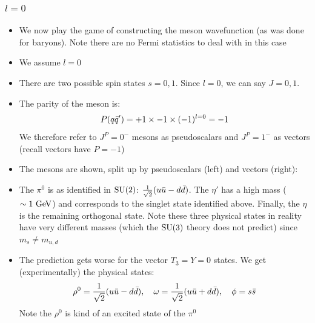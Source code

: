 \subsubsection{$l=0$}
\begin{itemize}
  \item We now play the game of constructing the meson wavefunction (as was done for baryons). Note there are no Fermi statistics to deal with in this case
  \item We assume $l=0$
  \item There are two possible spin states $s=0,1$. Since $l=0$, we can say $J=0,1$.
  \item The parity of the meson is:
  \begin{equation}
    P(q{\bar{q}}') = +1\times -1 \times (-1)^{l=0} = -1
  \end{equation}
  We therefore refer to $J^P = 0^-$ mesons as pseudoscalars and $J^P = 1^-$ as vectors (recall vectors have $P=-1$)
  \item The mesons are shown, split up by pseudoscalars (left) and vectors (right):
  \item The $\pi^0$ is as identified in $\operatorname{SU}(2)$: $\frac{1}{\sqrt{2}}(u\bar{u}-d\bar{d})$. The $\eta'$ has a high mass ($\sim1~\text{GeV}$) and corresponds to the singlet state identified above. Finally, the $\eta$ is the remaining orthogonal state. Note these three physical states in reality have very different masses (which the $\operatorname{SU}(3)$ theory does not predict) since $m_s \neq m_{u,d}$
  \item The prediction gets worse for the vector $T_3 = Y = 0$ states. We get (experimentally) the physical states:
  \begin{equation}
    \rho^0 = \frac{1}{\sqrt2} (u\bar{u} - d\bar{d}), \quad \omega = \frac{1}{\sqrt2}(u\bar{u}+d\bar{d}), \quad \phi = s\bar{s}
  \end{equation}
  Note the $\rho^0$ is kind of an excited state of the $\pi^0$
\end{itemize}

